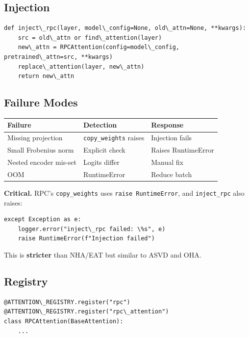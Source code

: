 \subsection{Injection}

\begin{lstlisting}
def inject\_rpc(layer, model\_config=None, old\_attn=None, **kwargs):
    src = old\_attn or find\_attention(layer)
    new\_attn = RPCAttention(config=model\_config, pretrained\_attn=src, **kwargs)
    replace\_attention(layer, new\_attn)
    return new\_attn
\end{lstlisting}

\subsection{Failure Modes}

\begin{table}[H]
\centering
\small
\begin{tabular}{lll}
\toprule
\textbf{Failure} & \textbf{Detection} & \textbf{Response} \\
\midrule
Missing projection & \texttt{copy\_weights} raises & Injection fails \\
Small Frobenius norm & Explicit check & Raises RuntimeError \\
Nested encoder mis-set & Logits differ & Manual fix \\
OOM & RuntimeError & Reduce batch \\
\bottomrule
\end{tabular}
\end{table}

\textbf{Critical.} RPC's \texttt{copy\_weights} uses \texttt{raise RuntimeError}, and 
\texttt{inject\_rpc} also raises:

\begin{lstlisting}
except Exception as e:
    logger.error("inject\_rpc failed: \%s", e)
    raise RuntimeError(f"Injection failed")
\end{lstlisting}

This is \textbf{stricter} than NHA/EAT but similar to ASVD and OHA.

\subsection{Registry}

\begin{lstlisting}
@ATTENTION\_REGISTRY.register("rpc")
@ATTENTION\_REGISTRY.register("rpc\_attention")
class RPCAttention(BaseAttention):
    ...
\end{lstlisting}

